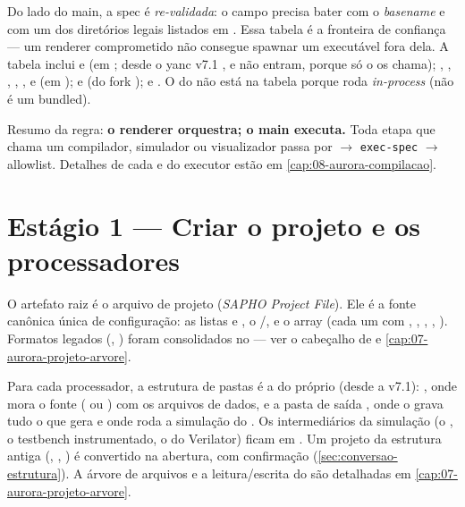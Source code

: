 Do lado do main, a spec é \emph{re-validada}: o campo  precisa bater
com o \emph{basename} e com um dos diretórios legais listados em
. Essa tabela é a fronteira de confiança —
um renderer comprometido não consegue spawnar um executável fora dela. A tabela
inclui  e  (em ; desde o
yanc v7.1 ,  e  não entram,
porque só o  os chama); ,
, , , ,
 e  (em );
 e  (do fork ); e
. O  do  não está na tabela porque
roda \emph{in-process} (não é um  bundled).

\begin{nota}
Resumo da regra: \textbf{o renderer orquestra; o main executa.} Toda etapa que
chama um compilador, simulador ou visualizador passa por
 $\rightarrow$ \lstinline|exec-spec| $\rightarrow$ allowlist. Detalhes
de cada  e do executor estão em \autoref{cap:08-aurora-compilacao}.
\end{nota}

\section{Estágio 1 — Criar o projeto e os processadores}
\label{sec:17-projeto}

O artefato raiz é o arquivo de projeto  (\emph{SAPHO Project File}). Ele
é a fonte canônica única de configuração: as listas  e
, o /, e o array
 (cada um com , , ,
, ). Formatos legados (,
) foram consolidados no  — ver o cabeçalho de
 e \autoref{cap:07-aurora-projeto-arvore}.

Para cada processador, a estrutura de pastas é a do próprio  (desde a
v7.1): , onde mora o fonte ( ou
) com os arquivos de dados, e a pasta de saída
, onde o  grava tudo o que gera e onde roda
a simulação do . Os intermediários da simulação (o ,
o testbench instrumentado, o  do Verilator) ficam em
. Um projeto da estrutura antiga
(, , ) é convertido na abertura,
com confirmação (\autoref{sec:conversao-estrutura}). A árvore de arquivos e a leitura/escrita do
 são detalhadas em \autoref{cap:07-aurora-projeto-arvore}.

